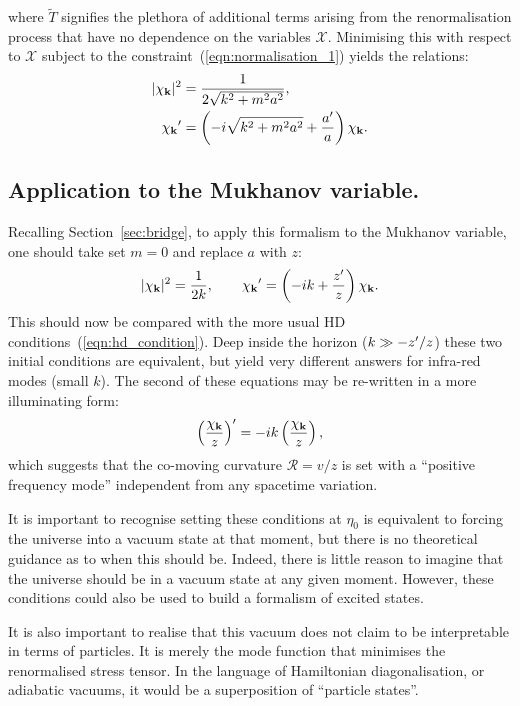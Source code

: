 where $\tilde{T}$ signifies the plethora of additional terms arising from the renormalisation process that have no dependence on the variables $\mathcal{X}$.
Minimising this with respect to $\mathcal{X}$ subject to the constraint~(\ref{eqn:normalisation_1}) yields the relations:
\begin{align}
  |\chi_{\mathbf{k}}|^2 &= \frac{1}{2\sqrt{k^2+m^2a^2}}, \\
  {{\chi_{\mathbf{k}}}^\prime} &= \left( -i \sqrt{k^2+m^2a^2} + \frac{{{a}^\prime}}{a} \right) \chi_{\mathbf{k}}.
  \label{eqn:rn_condition_m}
\end{align}


\subsection{Application to the Mukhanov variable.}
Recalling Section~\ref{sec:bridge}, to apply this formalism to the Mukhanov variable, one should take set $m=0$ and replace $a$ with $z$:
\begin{equation}        
  |\chi_{\mathbf{k}}|^2 = \frac{1}{2k},\qquad
  {{\chi_{\mathbf{k}}}^\prime} = \left( -i k + \frac{{{z}^\prime}}{z} \right) \chi_{\mathbf{k}}.
  \label{eqn:rn_condition}
\end{equation}
This should now be compared with the more usual HD conditions~(\ref{eqn:hd_condition}). Deep inside the horizon (${k\gg -{{{z}^\prime}}/{z}}$) these two initial conditions are equivalent, but yield very different answers for infra-red modes (small $k$).
The second of these equations may be re-written in a more illuminating form:
\begin{equation}
  {{\left( \frac{\chi_{\mathbf{k}}}{z} \right)}^\prime} = -i k \left( \frac{\chi_{\mathbf{k}}}{z} \right),
\end{equation}
which suggests that the co-moving curvature $\mathcal{R}=v/z$ is set with a ``positive frequency mode'' independent from any spacetime variation.

It is important to recognise setting these conditions at $\eta_0$ is equivalent to forcing the universe into a vacuum state at that moment, but there is no theoretical guidance as to when this should be. Indeed, there is little reason to imagine that the universe should be in a vacuum state at any given moment. However, these conditions could also be used to build a formalism of excited states.

It is also important to realise that this vacuum does not claim to be interpretable in terms of particles. It is merely the mode function that minimises the renormalised stress tensor. In the language of Hamiltonian diagonalisation, or adiabatic vacuums, it would be a superposition of ``particle states''.


